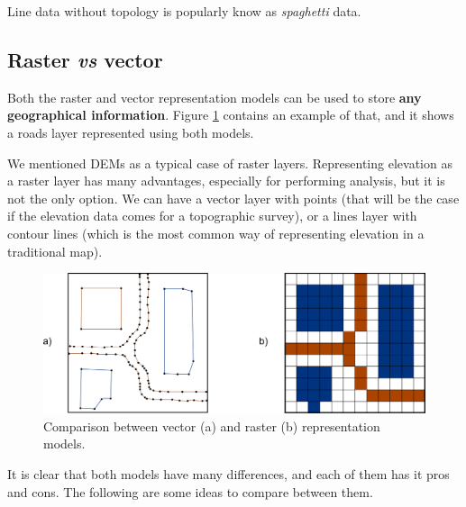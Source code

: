 Line data without topology is popularly know as \emph{spaghetti} data.


\subsection{Raster \emph{vs} vector}


Both the raster and vector representation models can be used to store \textbf{any geographical information}. Figure \ref{Fig:Representation_models} contains an example of that, and it shows a roads layer represented using both models. 

We mentioned DEMs as a typical case of raster layers. Representing elevation as a raster layer has many advantages, especially for performing analysis, but it is not the only option. We can have a vector layer with points (that will be the case if the elevation data comes for a topographic survey), or a lines layer with contour lines (which is the most common way of representing elevation in a traditional map).

\begin{figure}[!hbt]   
\centering
\includegraphics[width=\textwidth]{Data/Representation_models.pdf}
\caption{\small Comparison between vector (a) and raster (b) representation models.}
\label{Fig:Representation_models} 
\end{figure}

It is clear that both models have many differences, and each of them has it pros and cons. The following are some ideas to compare between them.


